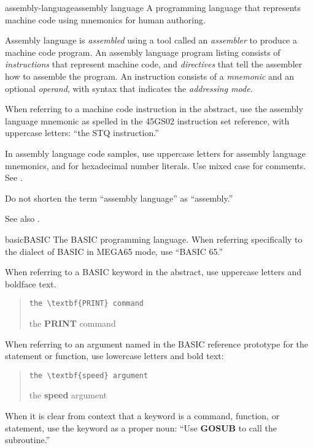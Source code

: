 \begin{sgentry}{assembly-language}{assembly language}
    A programming language that represents machine code using mnemonics for human authoring.

    Assembly language is \emph{assembled} using a tool called an \emph{assembler} to produce a machine code program. An assembly language program listing consists of \emph{instructions} that represent machine code, and \emph{directives} that tell the assembler how to assemble the program. An instruction consists of a \emph{mnemonic} and an optional \emph{operand}, with syntax that indicates the \emph{addressing mode}.

    When referring to a machine code instruction in the abstract, use the assembly language mnemonic as spelled in the 45GS02 instruction set reference, with uppercase letters: ``the STQ instruction.''

    In assembly language code samples, use uppercase letters for assembly language mnemonics, and for hexadecimal number literals. Use mixed case for comments. See .

    Do not shorten the term ``assembly language'' as ``assembly.''

    See also .
\end{sgentry}

\begin{sgentry}{basic}{BASIC}
    The BASIC programming language. When referring specifically to the dialect of BASIC in MEGA65 mode, use ``BASIC 65.''

    When referring to a BASIC keyword in the abstract, use uppercase letters and boldface text.

    \begin{quote}
        \texttt{the {\textbackslash}textbf\{PRINT\} command}

        \hrulefill

        the \textbf{PRINT} command
    \end{quote}

    When referring to an argument named in the BASIC reference prototype for the statement or function, use lowercase letters and bold text:

    \begin{quote}
        \texttt{the {\textbackslash}textbf\{speed\} argument}

        \hrulefill

        the \textbf{speed} argument
    \end{quote}

    When it is clear from context that a keyword is a command, function, or statement, use the keyword as a proper noun: ``Use \textbf{GOSUB} to call the subroutine.''
\end{sgentry}

